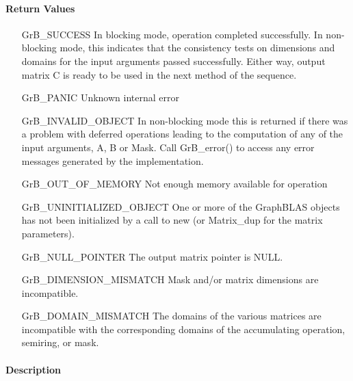 \paragraph{Return Values}

\begin{itemize}[leftmargin=2.1in]
	\item[{\sf GrB\_SUCCESS}]	      In blocking mode, operation
	completed successfully. In non-blocking mode, this indicates
	that the consistency tests on dimensions and domains for the
	input arguments passed successfully. Either way, output matrix
	{\sf C} is ready to be used in the next method of the sequence.

	\item[{\sf GrB\_PANIC}]		      Unknown internal error

    \item[{\sf GrB\_INVALID\_OBJECT}] In non-blocking mode this is returned if
    there was a problem with deferred operations leading to the computation of
    any of the input arguments, {\sf A}, {\sf B} or {\sf Mask}.  Call 
    {GrB\_error()} to access any error messages generated by the implementation.

	\item[{\sf GrB\_OUT\_OF\_MEMORY}]	      Not enough memory available
	for operation
    
    \item[{\sf GrB\_UNINITIALIZED\_OBJECT}]  One or more of the GraphBLAS 
    objects has not been initialized by a call to {\sf new} (or 
    {\sf Matrix\_dup} for the matrix parameters).
    
    \item[{\sf GrB\_NULL\_POINTER}]  The output matrix pointer is {\sf NULL}.

	\item[{\sf GrB\_DIMENSION\_MISMATCH}] Mask and/or matrix dimensions are
	incompatible.

	\item[{\sf GrB\_DOMAIN\_MISMATCH}]    The domains of the various
	matrices are incompatible with the corresponding domains of the
	accumulating operation, semiring, or mask.
\end{itemize}

\paragraph{Description}

